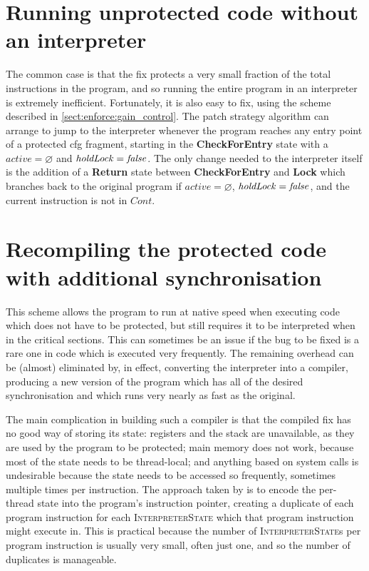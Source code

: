 \section{Running unprotected code without an interpreter}

The common case is that the fix protects a very small fraction of the
total instructions in the program, and so running the entire program
in an interpreter is extremely inefficient.  Fortunately, it is also
easy to fix, using the scheme described in
\autoref{sect:enforce:gain_control}.  The patch strategy algorithm can
arrange to jump to the interpreter whenever the program reaches any
entry point of a protected \gls{cfg} fragment, starting in the
\textbf{CheckForEntry} state with a $\mathit{active} = \varnothing$
and $\mathit{holdLock} = \mathit{false}$.  The only change needed to the
interpreter itself is the addition of a \textbf{Return} state between
\textbf{CheckForEntry} and \textbf{Lock} which branches back to the
original program if $\mathit{active} = \varnothing$,
$\mathit{holdLock} = \mathit{false}$, and the current instruction is not in
$\mathit{Cont}$.

\section{Recompiling the protected code with additional synchronisation}

This scheme allows the program to run at native speed when executing
code which does not have to be protected, but still requires it to be
interpreted when in the critical sections.  This can sometimes be an
issue if the bug to be fixed is a rare one in code which is executed
very frequently.  The remaining overhead can be (almost) eliminated
by, in effect, converting the interpreter into a compiler, producing a
new version of the program which has all of the desired
synchronisation and which runs very nearly as fast as the original.

The main complication in building such a compiler is that the compiled
fix has no good way of storing its state: registers and the stack are
unavailable, as they are used by the program to be protected; main
memory does not work, because most of the state needs to be
thread-local; and anything based on system calls is undesirable
because the state needs to be accessed so frequently, sometimes
multiple times per instruction.  The approach taken by
{\implementation} is to encode the per-thread state into the program's
instruction pointer, creating a duplicate of each program instruction
for each \textsc{InterpreterState} which that program instruction
might execute in.  This is practical because the number of
\textsc{InterpreterState}s per program instruction is usually very
small, often just one, and so the number of duplicates is manageable.

